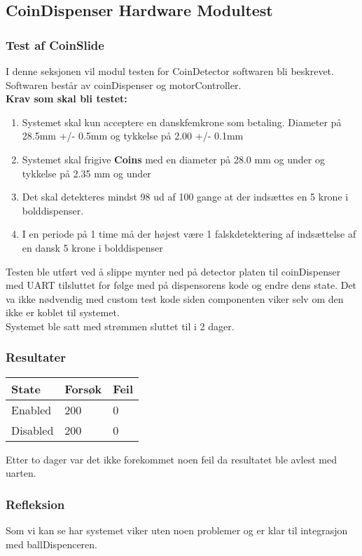 \documentclass[Modultest/Modultest_main.tex]{subfiles}
\begin{document}
\subsection{CoinDispenser Hardware Modultest}  \label{sec:Disp}

\subsubsection{Test af CoinSlide}
I denne seksjonen vil modul testen for CoinDetector softwaren bli beskrevet. Softwaren består av coinDispenser og motorController.\\


\textbf{Krav som skal bli testet:}
\begin{enumerate}
    \item Systemet skal kun acceptere en danskfemkrone som betaling. Diameter på 28.5mm +/- 0.5mm og tykkelse på 2.00 +/- 0.1mm
    \item Systemet skal frigive \textbf{Coins} med en diameter på 28.0 mm og under og tykkelse på 2.35 mm og under
    \item Det skal detekteres mindst 98 ud af 100 gange at der indsættes en 5 krone i bolddispenser.
    \item I en periode på 1 time må der højest være 1 falskdetektering af indsættelse af en dansk 5 krone i bolddispenser
\end{enumerate}

Testen ble utført ved å slippe mynter ned på detector platen til coinDispenser med UART tilsluttet for følge med på dispensorens kode og endre dens state. Det va ikke nødvendig med custom test kode siden componenten viker selv om den ikke er koblet til systemet.\\
Systemet ble satt med strømmen sluttet til i 2 dager.
\subsubsection{Resultater}
\begin{table}[H]
\Large
\centering
\begin{tabular}{|l|l|l|}
\hline

\textbf{State} & \textbf{Forsøk} & \textbf{Feil} \\ \hline
Enabled         & 200             & 0             \\ \hline
Disabled         & 200             & 0             \\ \hline

\end{tabular}
\end{table}

Etter to dager var det ikke forekommet noen feil da resultatet ble avlest med uarten. 
\subsubsection{Refleksion}
Som vi kan se har systemet viker uten noen problemer og er klar til integrasjon med ballDispenceren. 
\end{document}
